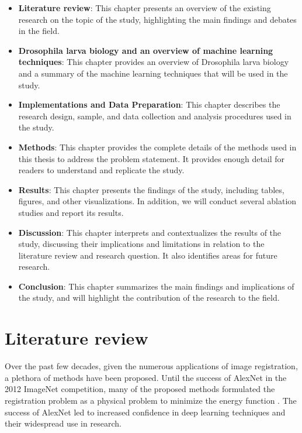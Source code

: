\documentclass{book}
\begin{document}
	\begin{itemize}
		\item \textbf{Literature review}: This chapter presents an overview of the existing research on the topic of the study, highlighting the main findings and debates in the field.
		\item \textbf{Drosophila larva biology and an overview of machine learning techniques}: This chapter provides an overview of Drosophila larva biology and a summary of the machine learning techniques that will be used in the study.
		\item \textbf{Implementations and Data Preparation}: This chapter describes the research design, sample, and data collection and analysis procedures used in the study. 
		\item \textbf{Methods}: This chapter provides the complete details of the methods used in this thesis to address the problem statement. It provides enough detail for readers to understand and replicate the study.
		\item \textbf{Results}: This chapter presents the findings of the study, including tables, figures, and other visualizations. In addition, we will conduct several ablation studies and report its results.
		\item \textbf{Discussion}: This chapter interprets and contextualizes the results of the study, discussing their implications and limitations in relation to the literature review and research question. It also identifies areas for future research.
		\item \textbf{Conclusion}: This chapter summarizes the main findings and implications of the study, and will highlight the contribution of the research to the field.
	\end{itemize}
	
	\chapter{Literature review}
	\label{chap:litreture}
	Over the past few decades, given the numerous applications of image registration, a plethora of methods have been proposed. Until the success of AlexNet \cite{AlexNet} in the 2012 ImageNet competition, many of the proposed methods formulated the registration problem as a physical problem to minimize the energy function \cite{THIRION1998243} \cite{536892} \cite{5193151} \cite{5338015} \cite{Avants2011ARE} \cite{1009381}. The success of AlexNet led to increased confidence in deep learning techniques and their widespread use in research.
	
\end{document}
